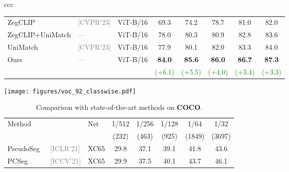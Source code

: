\documentclass[10pt,twocolumn,letterpaper]{article}
\newcommand{\green}[1]{\textcolor{ForestGreen}{#1}}
\newcommand{\venue}[1]{{\tiny\textcolor{gray}{[#1]}}}
\begin{document}
\begin{figure*}
\begin{tabular}{ccc}
\begin{table}
\begin{tabular}{lllccccc}
\midrule
    ZegCLIP~\cite{zhou2023zegclip} &                        \venue{CVPR'23} &                  ViT-B/16 &           69.3 &           74.2 &           78.7 &           81.0 &           82.0 \\
                  ZegCLIP+UniMatch &                  \textcolor{gray}{---} &                  ViT-B/16 &           78.0 &           80.3 &           80.9 &           82.8 &           83.6 \\
\midrule
UniMatch~\cite{yang2023revisiting} &                        \venue{CVPR'23} &                  ViT-B/16 &           77.9 &           80.1 &           82.0 &           83.3 &           84.0 \\
                       \multirow{2}{*}{Ours} & \multirow{2}{*}{\textcolor{gray}{---}} & \multirow{2}{*}{ViT-B/16} &           \textbf{84.0} &           \textbf{85.6} &           \textbf{86.0} &           \textbf{86.7} &           \textbf{87.3} \\
                                             &                                        &                           & \green{(+6.1)} & \green{(+5.5)} & \green{(+4.0)} & \green{(+3.4)} & \green{(+3.3)} \\
\bottomrule
\end{tabular}
\end{table} \begin{table}
    \centering
    \caption{\textbf{Class-Wise IoU} on Pascal VOC with 92 Labels.}
    \label{fig:classwise}
    \texttt{[image: figures/voc\_92\_classwise.pdf]}
\end{table}
\begin{table}
\centering
\caption{Comparison with state-of-the-art methods on \textbf{COCO}.}
\label{tab:sota_coco}
\scriptsize
\setlength{\tabcolsep}{3pt}
\begin{tabular}{lllccccc}
\toprule
   \multirow{2}{*}{Method} &                &     \multirow{2}{*}{Net} &     1/512 &    1/256 &    1/128 &    1/64 &    1/32 \\
   & & & (232) & (463) & (925) & (1849) & (3697) \\ 
\midrule
           PseudoSeg~\cite{zou2020pseudoseg} &                        \venue{ICLR'21} &                      XC65 &            29.8 &           37.1 &           39.1 &           41.8 &           43.6 \\
             PCSeg~\cite{zhong2021pixel} &                        \venue{ICCV'21} &                      XC65 &            29.9 &           37.5 &           40.1 &           43.7 &           46.1 \\

\end{tabular}
\end{table}
\end{tabular}
\end{figure*}
\end{document}
